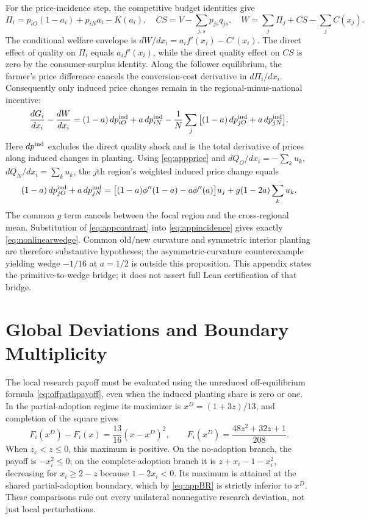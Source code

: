 \documentclass[USenglish]{article}
\begin{document}
For the price-incidence step, the competitive budget identities give
\[
\Pi_i=p_{iO}(1-a_i)+p_{iN}a_i-K(a_i),\quad
CS=V-\sum_{j,s}p_{js}q_{js},\quad
W=\sum_j\Pi_j+CS-\sum_j C(x_j).
\]
The conditional welfare envelope is $dW/dx_i=a_if'(x_i)-C'(x_i)$. The direct effect of quality on $\Pi_i$ equals $a_if'(x_i)$, while the direct quality effect on $CS$ is zero by the consumer-surplus identity. Along the follower equilibrium, the farmer's price difference cancels the conversion-cost derivative in $d\Pi_i/dx_i$. Consequently only induced price changes remain in the regional-minus-national incentive:
\begin{equation}
\frac{dG_i}{dx_i}-\frac{dW}{dx_i}
=(1-a)\,dp_{iO}^{\rm ind}+a\,dp_{iN}^{\rm ind}
-\frac1N\sum_j\big[(1-a)\,dp_{jO}^{\rm ind}
+a\,dp_{jN}^{\rm ind}\big].
\label{eq:appincidence}
\end{equation}
Here $dp^{\rm ind}$ excludes the direct quality shock and is the total derivative of prices along induced changes in planting. Using \eqref{eq:appprice} and $dQ_O/dx_i=-\sum_k u_k$, $dQ_N/dx_i=\sum_k u_k$, the $j$th region's weighted induced price change equals
\[
(1-a)\,dp_{jO}^{\rm ind}+a\,dp_{jN}^{\rm ind}
=\big[(1-a)\phi''(1-a)-a\phi''(a)\big]u_j
 +g(1-2a)\sum_k u_k.
\]
The common $g$ term cancels between the focal region and the cross-regional mean. Substitution of \eqref{eq:appcontrast} into \eqref{eq:appincidence} gives exactly \eqref{eq:nonlinearwedge}. Common old/new curvature and symmetric interior planting are therefore substantive hypotheses; the asymmetric-curvature counterexample yielding wedge $-1/16$ at $a=1/2$ is outside this proposition. This appendix states the primitive-to-wedge bridge; it does not assert full Lean certification of that bridge.

\section{Global Deviations and Boundary Multiplicity}
\label{app:globalP3}
The local research payoff must be evaluated using the unreduced off-equilibrium formula \eqref{eq:offpathpayoff}, even when the induced planting share is zero or one. In the partial-adoption regime its maximizer is $x^D=(1+3z)/13$, and completion of the square gives
\begin{equation}
 F_i(x^D)-F_i(x)=\frac{13}{16}(x-x^D)^2,\qquad
 F_i(x^D)=\frac{48z^2+32z+1}{208}.
 \label{eq:appBR}
\end{equation}
When $z_c<z\leq0$, this maximum is positive. On the no-adoption branch, the payoff is $-x_i^2\leq0$; on the complete-adoption branch it is $z+x_i-1-x_i^2$, decreasing for $x_i\geq2-z$ because $1-2x_i<0$. Its maximum is attained at the shared partial-adoption boundary, which by \eqref{eq:appBR} is strictly inferior to $x^D$. These comparisons rule out every unilateral nonnegative research deviation, not just local perturbations.
\end{document}
